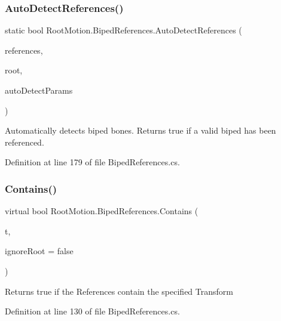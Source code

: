 \subsubsection{\texorpdfstring{Auto\+Detect\+References()}{AutoDetectReferences()}}
{\footnotesize\ttfamily static bool Root\+Motion.\+Biped\+References.\+Auto\+Detect\+References (\begin{DoxyParamCaption}\item[{ref \mbox{\hyperlink{class_root_motion_1_1_biped_references}{Biped\+References}}}]{references,  }\item[{Transform}]{root,  }\item[{\mbox{\hyperlink{struct_root_motion_1_1_biped_references_1_1_auto_detect_params}{Auto\+Detect\+Params}}}]{auto\+Detect\+Params }\end{DoxyParamCaption})\hspace{0.3cm}{\ttfamily [static]}}



Automatically detects biped bones. Returns true if a valid biped has been referenced. 



Definition at line 179 of file Biped\+References.\+cs.

\mbox{\label{class_root_motion_1_1_biped_references_ab0b1faadbb6500da51504049e8302409}} 
\subsubsection{\texorpdfstring{Contains()}{Contains()}}
{\footnotesize\ttfamily virtual bool Root\+Motion.\+Biped\+References.\+Contains (\begin{DoxyParamCaption}\item[{Transform}]{t,  }\item[{bool}]{ignore\+Root = {\ttfamily false} }\end{DoxyParamCaption})\hspace{0.3cm}{\ttfamily [virtual]}}



Returns true if the References contain the specified Transform 



Definition at line 130 of file Biped\+References.\+cs.


